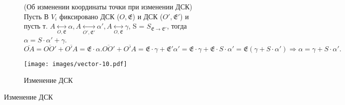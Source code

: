 \begin{figure}[h]
	\begin{subfigure}[t!]{0.6\linewidth}
	\begin{theorem}
		(Об изменении координаты точки при изменении ДСК) \\
		Пусть В \(V_i\) фиксировано ДСК (\(O, \mathfrak{E}\)) и ДСК (\(O', \mathfrak{E'}\)) и пусть т. \(A\underset{O, \mathfrak{E}}{\longleftrightarrow}\alpha, A\underset{O', \mathfrak{E'}}{\longleftrightarrow}\alpha', A\underset{O, \mathfrak{E}}{\longleftrightarrow}\gamma\), S = \(S_{\mathfrak{E}\to\mathfrak{E'}}\), тогда \(\alpha = S\cdot\alpha'+\gamma\). $\overline{OA} = \overline{OO'}+\overline{O'A} = \mathfrak{E}\cdot\alpha. \overline{OO'} + \overline{O'A} = \mathfrak{E}\cdot\gamma+\mathfrak{E'}\alpha' = \mathfrak{E}\cdot\gamma + \mathfrak{E}\cdot S\cdot \alpha' = \mathfrak{E}(\gamma+S\cdot\alpha')\Longrightarrow \alpha = \gamma+ S\cdot \alpha'.$
	\end{theorem}
	\end{subfigure}
	\begin{subfigure}[b!]{0.4\linewidth}
		\centering
		\texttt{[image: images/vector-10.pdf]}
		\caption*{Изменение ДСК}
		\label{Vector10}
	\end{subfigure}
\end{figure}

